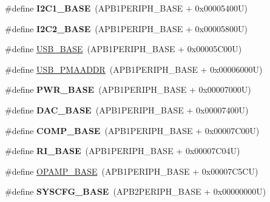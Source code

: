 \begin{DoxyCompactItemize}
\item 
\hypertarget{group___peripheral__memory__map_gacd72dbffb1738ca87c838545c4eb85a3}{\#define {\bfseries I2\-C1\-\_\-\-B\-A\-S\-E}~(A\-P\-B1\-P\-E\-R\-I\-P\-H\-\_\-\-B\-A\-S\-E + 0x00005400\-U)}\label{group___peripheral__memory__map_gacd72dbffb1738ca87c838545c4eb85a3}

\item 
\hypertarget{group___peripheral__memory__map_ga04bda70f25c795fb79f163b633ad4a5d}{\#define {\bfseries I2\-C2\-\_\-\-B\-A\-S\-E}~(A\-P\-B1\-P\-E\-R\-I\-P\-H\-\_\-\-B\-A\-S\-E + 0x00005800\-U)}\label{group___peripheral__memory__map_ga04bda70f25c795fb79f163b633ad4a5d}

\item 
\#define \hyperlink{group___peripheral__memory__map_gaa6c4cbed4ddbb3ecd77de93fab2a2e04}{U\-S\-B\-\_\-\-B\-A\-S\-E}~(A\-P\-B1\-P\-E\-R\-I\-P\-H\-\_\-\-B\-A\-S\-E + 0x00005\-C00\-U)
\item 
\#define \hyperlink{group___peripheral__memory__map_gaf992dfdd5707568c5cb5506e2347e808}{U\-S\-B\-\_\-\-P\-M\-A\-A\-D\-D\-R}~(A\-P\-B1\-P\-E\-R\-I\-P\-H\-\_\-\-B\-A\-S\-E + 0x00006000\-U)
\item 
\hypertarget{group___peripheral__memory__map_gac691ec23dace8b7a649a25acb110217a}{\#define {\bfseries P\-W\-R\-\_\-\-B\-A\-S\-E}~(A\-P\-B1\-P\-E\-R\-I\-P\-H\-\_\-\-B\-A\-S\-E + 0x00007000\-U)}\label{group___peripheral__memory__map_gac691ec23dace8b7a649a25acb110217a}

\item 
\hypertarget{group___peripheral__memory__map_gad18d0b914c7f68cecbee1a2d23a67d38}{\#define {\bfseries D\-A\-C\-\_\-\-B\-A\-S\-E}~(A\-P\-B1\-P\-E\-R\-I\-P\-H\-\_\-\-B\-A\-S\-E + 0x00007400\-U)}\label{group___peripheral__memory__map_gad18d0b914c7f68cecbee1a2d23a67d38}

\item 
\hypertarget{group___peripheral__memory__map_gaa9f5d2999c6918e385d7a526c4f6b1d3}{\#define {\bfseries C\-O\-M\-P\-\_\-\-B\-A\-S\-E}~(A\-P\-B1\-P\-E\-R\-I\-P\-H\-\_\-\-B\-A\-S\-E + 0x00007\-C00\-U)}\label{group___peripheral__memory__map_gaa9f5d2999c6918e385d7a526c4f6b1d3}

\item 
\hypertarget{group___peripheral__memory__map_ga8fdc749e6f184b3cd9b01f179af62e4c}{\#define {\bfseries R\-I\-\_\-\-B\-A\-S\-E}~(A\-P\-B1\-P\-E\-R\-I\-P\-H\-\_\-\-B\-A\-S\-E + 0x00007\-C04\-U)}\label{group___peripheral__memory__map_ga8fdc749e6f184b3cd9b01f179af62e4c}

\item 
\#define \hyperlink{group___peripheral__memory__map_ga6e9722d15c7ed794f0eca9682f64c03c}{O\-P\-A\-M\-P\-\_\-\-B\-A\-S\-E}~(A\-P\-B1\-P\-E\-R\-I\-P\-H\-\_\-\-B\-A\-S\-E + 0x00007\-C5\-C\-U)
\item 
\hypertarget{group___peripheral__memory__map_ga62246020bf3b34b6a4d8d0e84ec79d3d}{\#define {\bfseries S\-Y\-S\-C\-F\-G\-\_\-\-B\-A\-S\-E}~(A\-P\-B2\-P\-E\-R\-I\-P\-H\-\_\-\-B\-A\-S\-E + 0x00000000\-U)}\label{group___peripheral__memory__map_ga62246020bf3b34b6a4d8d0e84ec79d3d}


\end{DoxyCompactItemize}

